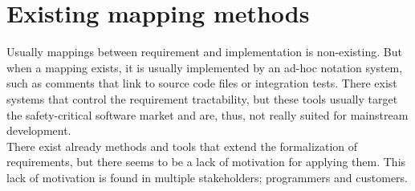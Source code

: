 \section{Existing mapping methods}
Usually mappings between requirement and implementation is non-existing. But when a mapping exists, it is usually implemented by an ad-hoc notation system, such as comments that link to source code files or integration tests. There exist systems that control the requirement tractability, but these tools usually target the safety-critical software market and are, thus, not really suited for mainstream development.\\%

There exist already methods and tools that extend the formalization of requirements, but there seems to be a lack of motivation for applying them. This lack of motivation is found in multiple stakeholders; programmers and customers.

